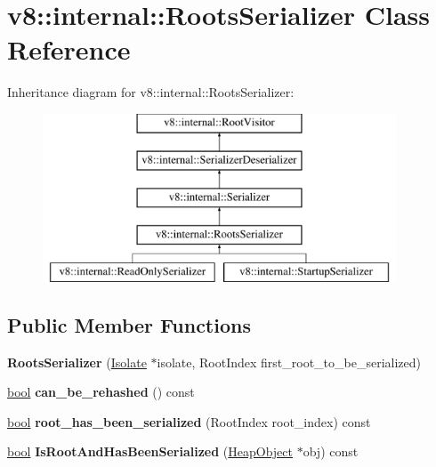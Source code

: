 \hypertarget{classv8_1_1internal_1_1RootsSerializer}{}\section{v8\+:\+:internal\+:\+:Roots\+Serializer Class Reference}
\label{classv8_1_1internal_1_1RootsSerializer}
Inheritance diagram for v8\+:\+:internal\+:\+:Roots\+Serializer\+:\begin{figure}[H]
\begin{center}
\leavevmode
\includegraphics[height=5.000000cm]{classv8_1_1internal_1_1RootsSerializer}
\end{center}
\end{figure}
\subsection*{Public Member Functions}
\begin{DoxyCompactItemize}
\item 
\mbox{\label{classv8_1_1internal_1_1RootsSerializer_ad1a71abd11ba692ffadeea36c3d067fe}} 
{\bfseries Roots\+Serializer} (\mbox{\hyperlink{classv8_1_1internal_1_1Isolate}{Isolate}} $\ast$isolate, Root\+Index first\+\_\+root\+\_\+to\+\_\+be\+\_\+serialized)
\item 
\mbox{\label{classv8_1_1internal_1_1RootsSerializer_a9877157656c1004952a12f7057168ac9}} 
\mbox{\hyperlink{classbool}{bool}} {\bfseries can\+\_\+be\+\_\+rehashed} () const
\item 
\mbox{\label{classv8_1_1internal_1_1RootsSerializer_a27a2be156a441fbd227f7028c159807b}} 
\mbox{\hyperlink{classbool}{bool}} {\bfseries root\+\_\+has\+\_\+been\+\_\+serialized} (Root\+Index root\+\_\+index) const
\item 
\mbox{\label{classv8_1_1internal_1_1RootsSerializer_a5b01092f350c0679864f477743538088}} 
\mbox{\hyperlink{classbool}{bool}} {\bfseries Is\+Root\+And\+Has\+Been\+Serialized} (\mbox{\hyperlink{classv8_1_1internal_1_1HeapObject}{Heap\+Object}} $\ast$obj) const
\end{DoxyCompactItemize}
